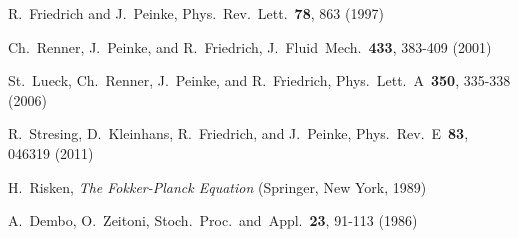 \documentclass[aps,twocolumn,superscriptaddress,showpacs,showkeys]{revtex4}
\begin{document}
{\begin{thebibliography}{00}
   R.~Friedrich and J.~Peinke,
                        Phys.~Rev.~Lett.~{\bf 78}, 863 (1997)


     Ch.~Renner, J.~Peinke, and R.~Friedrich, 
                       J.~Fluid~Mech.~{\bf 433}, 383-409 (2001)


      St.~Lueck, Ch.~Renner, J.~Peinke, and R.~Friedrich,
                       Phys.~Lett.~A~{\bf 350}, 335-338 (2006)


   R.~Stresing, D.~Kleinhans, R.~Friedrich, and J.~Peinke,
                       Phys.~Rev.~E~{\bf 83}, 046319 (2011)



       H.~Risken,
                         {\it The Fokker-Planck Equation}
                         (Springer, New York, 1989)



       A.~Dembo, O.~Zeitoni,
                        Stoch.~Proc.~and~Appl.~{\bf 23}, 91-113 (1986)



\end{thebibliography}}
\end{document}
